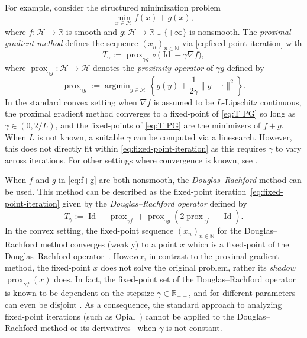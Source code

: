 \documentclass[a4paper,12pt]{article}
\DeclareMathOperator{\Id}{Id}
\DeclareMathOperator{\prox}{prox}
\DeclareMathOperator*{\argmin}{argmin}
\begin{document}
For example, consider the structured minimization problem
\begin{equation}\label{eq:f+g}
    \min_{x \in \mathcal{H}} f(x) + g(x),
\end{equation}
where $f: \mathcal{H} \to \mathbb{R}$ is smooth and $g: \mathcal{H} \to \mathbb{R} \cup \{+\infty\}$ is nonsmooth. The \emph{proximal gradient method} defines the sequence $(x_n)_{n\in\mathbb{N}}$ via \eqref{eq:fixed-point-iteration} with 
\begin{equation}\label{eq:T PG}
T_\gamma := \prox_{\gamma g}\circ\big( \Id - \gamma \nabla f),
\end{equation}
where $\prox_{\gamma g}\colon\mathcal{H}\to\mathcal{H}$ denotes the \emph{proximity operator} of $\gamma g$ defined by
$$ \prox_{\gamma g}:= \argmin_{y \in \mathcal{H}} \left\{ g(y) + \frac{1}{2\gamma}\|y- \cdot\|^2\right\}. $$
In the standard convex setting when $\nabla f$ is assumed to be $L$-Lipschitz continuous, the proximal gradient method converges to a fixed-point of \eqref{eq:T PG} so long as $\gamma \in (0,2/L)$, and the fixed-points of \eqref{eq:T PG} are the minimizers of $f+g$. When $L$ is not known, a suitable $\gamma$  can be computed via a linesearch. However, this does not directly fit within \eqref{eq:fixed-point-iteration} as this requires $\gamma$ to vary across iterations. For other settings where convergence is known, see \cite{lee2016gradient,jia2023convergence}. 

When $f$ and $g$ in \eqref{eq:f+g} are both nonsmooth, the \emph{Douglas--Rachford} method \cite{douglas1956numerical,lions1979splitting} can be used. This method can be described as the fixed-point iteration~\eqref{eq:fixed-point-iteration} given by the \emph{Douglas--Rachford operator} defined by
\begin{equation}\label{DR operator sec 1}
     T_{\gamma}:=\Id-\prox_{\gamma f}+\prox_{\gamma g}(2\prox_{\gamma f} - \Id).
 \end{equation} 
In the convex setting, the fixed-point sequence $(x_n)_{n\in\mathbb{N}}$ for the Douglas--Rachford method converges (weakly) to a point $x$ which is a fixed-point of the Douglas--Rachford operator~\cite{douglas1956numerical,svaiter2011weak}. However, in contrast to the proximal gradient method, the fixed-point $x$ does not solve the original problem, rather its \emph{shadow} $\prox_{\gamma f}(x)$ does. In fact, the fixed-point set of the Douglas--Rachford operator is known to be dependent on the stepsize $\gamma\in\mathbb{R}_{++}$, and for different parameters can even be disjoint \cite[Remark~4.13]{atenas2025relocated}. As a consequence, the standard approach to analyzing  fixed-point iterations (such as Opial~\cite{MR211301}) cannot be applied to the Douglas--Rachford method or its derivatives~\cite{davis2017convergence,rieger2020backward} when $\gamma$ is not constant. 
\end{document}
